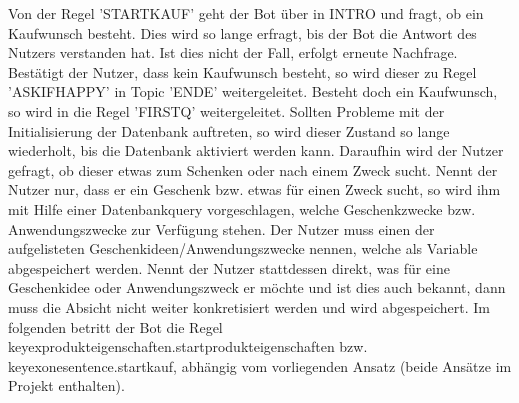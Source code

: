 Von der Regel 'STARTKAUF' geht der Bot über in INTRO und fragt, ob ein Kaufwunsch besteht. Dies wird so lange erfragt, bis der Bot die Antwort des Nutzers verstanden hat. 
Ist dies nicht der Fall, erfolgt erneute Nachfrage. Bestätigt der Nutzer, dass kein Kaufwunsch besteht, so wird dieser zu Regel 'ASKIFHAPPY' in Topic 'ENDE' weitergeleitet. Besteht doch ein Kaufwunsch, so wird in die Regel 'FIRSTQ' weitergeleitet. Sollten Probleme mit der Initialisierung der Datenbank auftreten, so wird dieser Zustand so lange wiederholt, bis die Datenbank aktiviert werden kann. 
Daraufhin wird der Nutzer gefragt, ob dieser etwas zum Schenken oder nach einem Zweck sucht. Nennt der Nutzer nur, dass er ein Geschenk bzw. etwas für einen Zweck sucht, so wird ihm mit Hilfe einer Datenbankquery vorgeschlagen, welche Geschenkzwecke bzw. Anwendungszwecke zur Verfügung stehen. Der Nutzer muss einen der aufgelisteten Geschenkideen/Anwendungszwecke nennen, welche als Variable abgespeichert werden. Nennt der Nutzer stattdessen direkt, was für eine Geschenkidee oder Anwendungszweck er möchte und ist dies auch bekannt, dann muss die Absicht nicht weiter konkretisiert werden und wird abgespeichert. 
Im folgenden betritt der Bot die Regel keyexprodukteigenschaften.startprodukteigenschaften bzw. keyexonesentence.startkauf, abhängig vom vorliegenden Ansatz (beide Ansätze im Projekt enthalten). 

